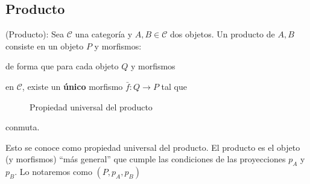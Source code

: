 \subsection{Producto}

\begin{definicion}
    (Producto): Sea $\mathscr{C}$ una categoría y $A,B \in \mathscr{C}$ dos objetos. Un producto de $A,B$ consiste en un objeto $P$ y morfismos:

    \begin{center}
    \end{center}
    de forma que para cada objeto $Q$ y morfismos


    \begin{figure}[htpb]
        \centering
        \label{diag:producto}
    \end{figure}
        
    en $\mathscr{C}$, existe un \textbf{único} morfismo $\bar{f}: Q \longrightarrow P$ tal que 

    \begin{figure}[htpb]
        \centering
        \caption{Propiedad universal del producto}
        \label{diag:universal-producto}
    \end{figure}
    conmuta. 
    
    Esto se conoce como propiedad universal del producto. El producto es el objeto (y morfismos) ``más general'' que cumple las condiciones de las proyecciones $p_{A}$ y $p_{B}$.
    Lo notaremos como $(P, p_{A}, p_{B})$
    
\end{definicion}

